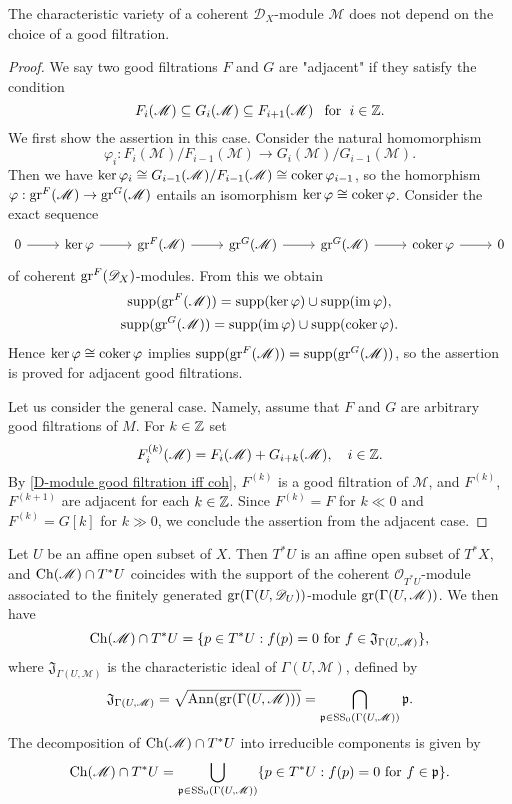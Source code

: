 \begin{theorem}\label{D-module coherent module char variety independent filtration}
The characteristic variety of a coherent $\mathscr{D}_X$-module $\mathscr{M}$ does not depend on the choice of a good filtration.
\end{theorem}
\begin{proof}
We say two good filtrations $F$ and $G$ are "adjacent" if they satisfy the condition
\[F_i(\mathscr{M})\subseteq G_i(\mathscr{M})\subseteq F_{i+1}(\mathscr{M})\hspace{8pt}\text{for}\hspace{6pt} i\in\mathbb{Z}.\]
We first show the assertion in this case. Consider the natural homomorphism
\[\varphi_i:F_i(\mathscr{M})/F_{i-1}(\mathscr{M})\to G_i(\mathscr{M})/G_{i-1}(\mathscr{M}).\]
Then we have $\operatorname{ker}\varphi_i\cong G_{i-1}(\mathscr{M})/F_{i-1}(\mathscr{M})\cong\operatorname{coker}\varphi_{i-1}$, so the homorphism $\varphi:\mathrm{gr}^F(\mathscr{M})\to \mathrm{gr}^G(\mathscr{M})$ entails an isomorphism $\operatorname{ker}\varphi\cong\operatorname{coker}\varphi$. Consider the exact sequence
\[\begin{tikzcd}
0\ar[r]&\ker\varphi\ar[r]&\gr^F(\mathscr{M})\ar[r]&\gr^G(\mathscr{M})\ar[r]&\gr^G(\mathscr{M})\ar[r]&\coker\varphi\ar[r]&0
\end{tikzcd}\]
of coherent $\mathrm{gr}^F(\mathscr{D}_X)$-modules. From this we obtain
\begin{gather*}
\mathrm{supp}(\mathrm{gr}^F(\mathscr{M}))=\mathrm{supp}(\operatorname{ker}\varphi)\cup\mathrm{supp}(\operatorname{im}\varphi),\\
\mathrm{supp}(\mathrm{gr}^G(\mathscr{M}))=\mathrm{supp}(\operatorname{im}\varphi)\cup\mathrm{supp}(\operatorname{coker}\varphi).
\end{gather*}
Hence $\operatorname{ker}\varphi\cong\operatorname{coker}\varphi$ implies $\mathrm{supp}(\mathrm{gr}^F(\mathscr{M}))=\mathrm{supp}(\mathrm{gr}^G(\mathscr{M}))$, so the assertion is proved for adjacent good filtrations.\par
Let us consider the general case. Namely, assume that $F$ and $G$ are arbitrary good filtrations of $M$. For $k\in\mathbb{Z}$ set
\[F_i^{(k)}(\mathscr{M})=F_i(\mathscr{M})+G_{i+k}(\mathscr{M}),\quad i\in\mathbb{Z}.\]
By \cref{D-module good filtration iff coh}, $F^{(k)}$ is a good filtration of $\mathscr{M}$, and $F^{(k)}$, $F^{(k+1)}$ are adjacent for each $k\in\mathbb{Z}$. Since $F^{(k)}=F$ for $k\ll 0$ and $F^{(k)}=G[k]$ for $k\gg 0$, we conclude the assertion from the adjacent case.
\end{proof}

Let $U$ be an affine open subset of $X$. Then $T^*U$ is an affine open subset of $T^*X$, and $\mathrm{Ch}(\mathscr{M})\cap T^*U$ coincides with the support of the coherent $\mathscr{O}_{T^*U}$-module associated to the finitely generated $\mathrm{gr}(\Gamma(U,\mathscr{D}_U))$-module $\mathrm{gr}(\Gamma(U,\mathscr{M}))$. We then have
\[\mathrm{Ch}(\mathscr{M})\cap T^*U=\{p\in T^*U:\text{$f(p)=0$ for $f\in\mathfrak{J}_{\Gamma(U,\mathscr{M})}$}\},\]
where $\mathfrak{J}_{\Gamma(U,\mathscr{M})}$ is the characteristic ideal of $\Gamma(U,\mathscr{M})$, defined by
\[\mathfrak{J}_{\Gamma(U,\mathscr{M})}=\sqrt{\mathrm{Ann}(\mathrm{gr}(\Gamma(U,\mathscr{M})))}=\bigcap_{\mathfrak{p}\in\mathrm{SS}_0(\Gamma(U,\mathscr{M}))}\mathfrak{p}.\]
The decomposition of $\mathrm{Ch}(\mathscr{M})\cap T^*U$ into irreducible components is given by
\[\mathrm{Ch}(\mathscr{M})\cap T^*U=\bigcup_{\mathfrak{p}\in\mathrm{SS}_0(\Gamma(U,\mathscr{M}))}\{p\in T^*U:\text{$f(p)=0$ for $f\in\mathfrak{p}$}\}.\]

